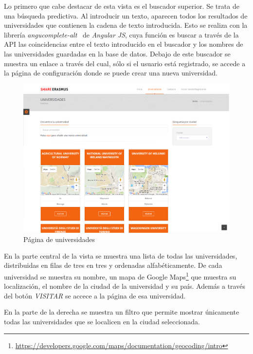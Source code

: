 \documentclass[a4paper, 12pt]{book}
\begin{document}
Lo primero que cabe destacar de esta vista es el buscador superior. Se trata de una búsqueda predictiva. Al introducir un texto, aparecen todos los resultados de universidades que contienen la cadena de texto introducida. Esto se realiza con la librería  \textit{angucomplete-alt}~\cite{pagina-angucomplete} de  \textit{Angular JS}, cuya función es buscar a través de la API las coincidencias entre el texto introducido en el buscador y los nombres de las universidades guardadas en la base de datos. Debajo de este buscador se muestra un enlace a través del cual, sólo si el usuario está registrado, se accede a la página de configuración donde se puede crear una nueva universidad.
\newline

\begin{figure}[H]
  \centering
  \includegraphics[width=14cm, keepaspectratio]{img/universidades.png}
  \caption{Página de universidades}
  \label{fig:universidades}
\end{figure} 

En la parte central de la vista se muestra una lista de todas las universidades, distribuidas en filas de tres en tres y ordenadas alfabéticamente. De cada universidad se muestra su nombre, un mapa de Google Maps\footnote{\url{https://developers.google.com/maps/documentation/geocoding/intro}} que muestra su localización, el nombre de la ciudad de la universidad y su país. Además a través del botón \textit{VISITAR} se accece a la página de esa universidad.
\newline

En la parte de la derecha se muestra un filtro que permite mostrar únicamente todas las universidades que se localicen en la ciudad seleccionada.
\newline
\end{document}
